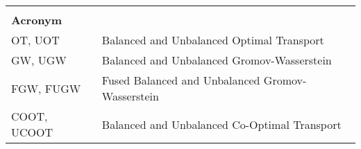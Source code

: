 \begin{table}[h]
\begin{tabular}{l l}
    & \\

    \textbf{Acronym} & \\
    OT, UOT & Balanced and Unbalanced Optimal Transport \\
    GW, UGW & Balanced and Unbalanced Gromov-Wasserstein \\
    FGW, FUGW & Fused Balanced and Unbalanced Gromov-Wasserstein \\
    COOT, UCOOT & Balanced and Unbalanced Co-Optimal Transport
\end{tabular}
\end{table}